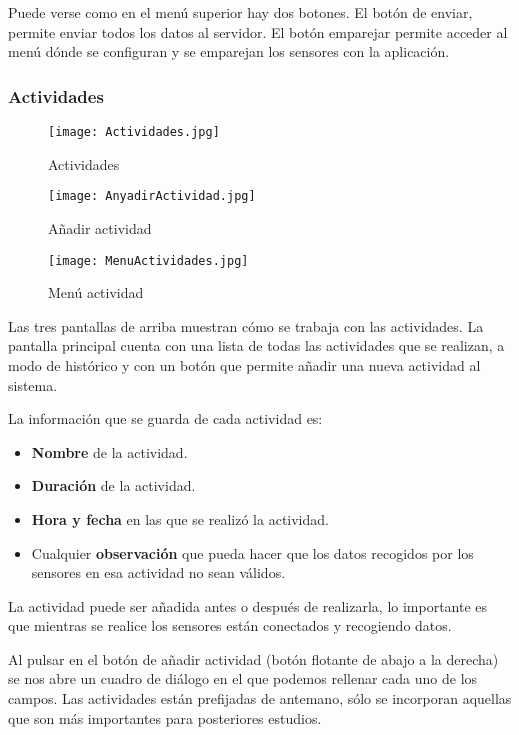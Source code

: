 \documentclass[11pt,spanish]{article}
\begin{document}
Puede verse como en el menú superior hay dos botones. El botón de enviar, permite enviar todos los datos al servidor. El botón emparejar permite acceder al menú dónde se configuran y se emparejan los sensores con la aplicación.
\newpage

\subsubsection{Actividades}
\begin{figure}[!htb]
  \texttt{[image: Actividades.jpg]}
  \caption{Actividades}
\endminipage\hfill
{}
  \texttt{[image: AnyadirActividad.jpg]}
  \caption{Añadir actividad}
\endminipage\hfill
{}%
  \texttt{[image: MenuActividades.jpg]}
  \caption{Menú actividad}
\endminipage
\end{figure}

Las tres pantallas de arriba muestran cómo se trabaja con las actividades. La pantalla principal cuenta con una lista de todas las actividades que se realizan, a modo de histórico y con un botón que permite añadir una nueva actividad al sistema.
\newline

La información que se guarda de cada actividad es:

\begin{itemize}
	\item {\bf Nombre} de la actividad.
	\item {\bf Duración} de la actividad.
	\item {\bf Hora y fecha} en las que se realizó la actividad.
	\item Cualquier {\bf observación} que pueda hacer que los datos recogidos por los sensores en esa actividad no sean válidos.
\end{itemize}

La actividad puede ser añadida antes o después de realizarla, lo importante es que mientras se realice los sensores están conectados y recogiendo datos.
\newline

Al pulsar en el botón de añadir actividad (botón flotante de abajo a la derecha) se nos abre un cuadro de diálogo en el que podemos rellenar cada uno de los campos. Las actividades están prefijadas de antemano, sólo se incorporan aquellas que son más importantes para posteriores estudios.
\newline
\end{document}
